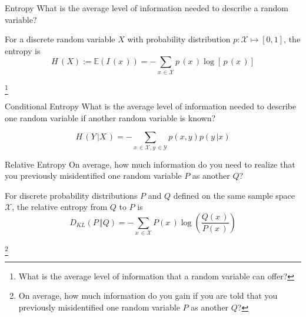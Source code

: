 \documentclass[10pt,aspectratio=1610]{beamer}
\newcommand\blfootnote[1]{%
  \begingroup
  \renewcommand\thefootnote{}\footnote{#1}%
  \addtocounter{footnote}{-1}%
  \endgroup
}
\begin{document}
\begin{frame}{Entropy}
	\vspace*{\fill}
	What is the average level of information needed to describe a random variable?
	\vspace*{\fill}
	\begin{definition}[entropy]
		For a discrete random variable \(X\) with probability distribution \(p:\mathcal{X} \mapsto [0,1]\), the entropy is
		\begin{equation}
			H\,(X) := \mathbb{E} \left(I\,(x\,)\right) = -\sum_{x \,\in\mathcal{X}} p\,(x\,) \log \left[\,p\,(x\,)\right]
		\end{equation}
	\end{definition}
	\vspace*{\fill}
	\blfootnote{What is the average level of information that a random variable can offer?}
\end{frame}

\begin{frame}{Conditional Entropy}
	\vspace*{\fill}
	What is the average level of information needed to describe one random variable if another random variable is known?
	\vspace*{\fill}
	\begin{definition}
		\begin{equation}
			H\,\left(Y\,\vert X\,\right) = -\sum_{x\,\in \mathcal{X}, y\,\in \mathcal{Y}} p\left(x, y\right) p\left(y\,\vert x\right)
		\end{equation}
	\end{definition}
	\vspace*{\fill}
\end{frame}

\begin{frame}{Relative Entropy}
	\vspace*{\fill}
	On average, how much information do you need to realize that you previously misidentified one random variable \(P\) as another \(Q\)?
	\vspace*{\fill}
	\begin{definition}
		For discrete probability distributions \(P\) and \(Q\) defined on the same sample space \(\mathcal{X}\), the relative entropy from \(Q\) to \(P\) is
		\begin{equation}
			D_{KL} (P\,\Vert Q) = -\sum_{x\,\in \mathcal{X}} P(x\,) \log \left( \frac{Q(x\,)}{P(x\,)}\right)
		\end{equation}
	\end{definition}
	\vspace*{\fill}
	\blfootnote{On average, how much information do you gain if you are told that you previously misidentified one random variable \(P\) as another \(Q\)?}
\end{frame}
\end{document}
